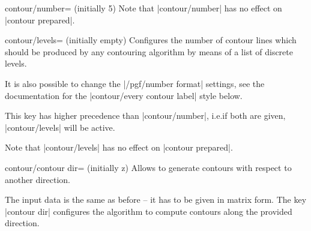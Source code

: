 {{\begin{pgfplotskey}{contour/number= (initially 5)}
    Note that |contour/number| has no effect on |contour prepared|.
\end{pgfplotskey}

\begin{pgfplotskey}{contour/levels= (initially empty)}
    Configures the number of contour lines which should be produced by any
    contouring algorithm by means of a list of discrete levels.
\pgfplotsexpensiveexample
\begin{codeexample}[]
\end{codeexample}
    It is also possible to change the |/pgf/number format| settings, see the
    documentation for the |contour/every contour label| style below.

    This key has higher precedence than |contour/number|, i.e.\@ if both are
    given, |contour/levels| will be active.

    Note that |contour/levels| has no effect on |contour prepared|.
\end{pgfplotskey}

\begin{pgfplotskey}{contour/contour dir= (initially z)}
    Allows to generate contours with respect to another direction.
\pgfplotsexpensiveexample
\begin{codeexample}[]
\end{codeexample}

    The input data is the same as before -- it has to be given in matrix form.
    The key |contour dir| configures the algorithm to compute contours along
    the provided direction.


\end{pgfplotskey}}}
